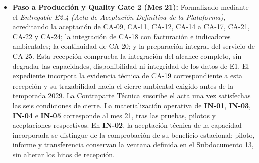 \begin{itemize}
    Para \textbf{IN-02}, $M_{\mathrm{inv}}$ corresponde al primer junio disponible con IN-01 y sus interfaces aceptadas, no anterior al mes 21. El piloto comprende junio--agosto, desde $M_{\mathrm{inv}}$ hasta $M_{\mathrm{inv}}+2$; los resultados se observan durante las botaduras hasta $M_{\mathrm{inv}}+5$ y se consolidan con la evaluación y transferencia en $M_{\mathrm{inv}}+6$. El ciclo completo, incluida la recepción de abril--mayo, se aplica desde $M_{\mathrm{inv}}+10$ cuando el plazo contractual permite concluir su evaluación. Estas ventanas se vinculan a la fecha de inicio contractual y respetan las restricciones operacionales sin desplazar hitos.
    \item \textbf{Paso a Producción y Quality Gate 2 (Mes 21):} Formalizado mediante el \emph{Entregable E2.4 (Acta de Aceptación Definitiva de la Plataforma)}, acreditando la aceptación de CA-09, CA-11, CA-12, CA-14 a CA-17, CA-21, CA-22 y CA-24; la integración de CA-18 con facturación e indicadores ambientales; la continuidad de CA-20; y la preparación integral del servicio de CA-25. Esta recepción comprueba la integración del alcance completo, sin degradar las capacidades, disponibilidad ni integridad de los datos de E1. El expediente incorpora la evidencia técnica de CA-19 correspondiente a esta recepción y su trazabilidad hacia el cierre ambiental exigido antes de la temporada 2029. La Contraparte Técnica suscribe el acta una vez satisfechas las seis condiciones de cierre. La materialización operativa de \textbf{IN-01}, \textbf{IN-03}, \textbf{IN-04} e \textbf{IN-05} corresponde al mes 21, tras las pruebas, pilotos y aceptaciones respectivos. En \textbf{IN-02}, la aceptación técnica de la capacidad incorporada se distingue de la comprobación de su beneficio estacional: piloto, informe y transferencia conservan la ventana definida en el Subdocumento 13, sin alterar los hitos de recepción.
\end{itemize}

